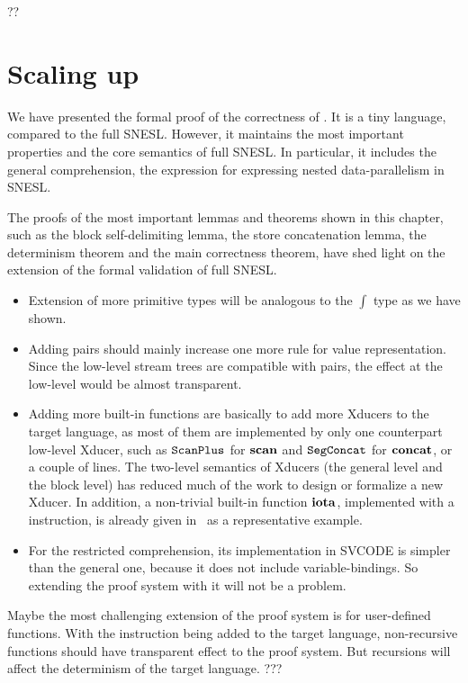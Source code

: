 \begin{cor}
	??
\end{cor}

\section{Scaling up}

We have presented the formal proof of the correctness of \fmsnesl. 
It is a tiny language, compared to the full SNESL. 
However, it maintains the most important properties and the core semantics of full SNESL.
In particular, it includes the general comprehension, the expression for expressing nested data-parallelism in SNESL. 
 
The proofs of the most important lemmas and theorems shown in this chapter, such as the block self-delimiting lemma, the store concatenation lemma, the determinism theorem and the main correctness theorem, have shed light on the extension of  the formal validation of full SNESL. 


\begin{itemize}
	\item Extension of more primitive types will be analogous to the $\int$ type as we have shown.
	
	\item Adding pairs should mainly increase one more rule for value representation. Since the low-level stream trees are compatible with pairs, the effect at the low-level would be almost transparent. 
	
	\item Adding more built-in functions are basically to add more Xducers to the target language, as most of them are implemented by only one counterpart low-level Xducer, such as $\mathtt{ScanPlus}_{}$ for $\mathbf{scan}$ and $\mathtt{SegConcat}$ for $\mathbf{concat}$, or a couple of lines.
	The two-level semantics of Xducers (the general level and the block level) has reduced much of the work to design or formalize a new Xducer.
	In addition, a non-trivial built-in function $\mathbf{iota}$, implemented with a \wc instruction, is already given in \fmsnesl \  as a representative example.
 
	
	\item For the restricted comprehension, its implementation in SVCODE is simpler than the general one, because it does not include variable-bindings. So extending the proof system with it will not be a problem. 
	
\end{itemize}

Maybe the most challenging extension of the proof system is for user-defined functions. 
With the \sc instruction being added to the target language, non-recursive functions should have transparent effect to the proof system. 
But recursions will affect the determinism of the target language.  ???



